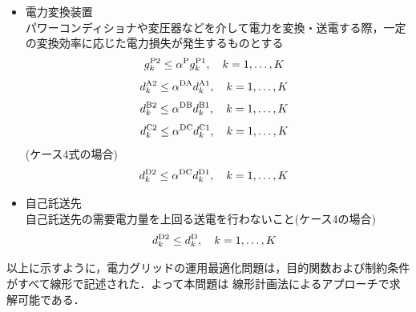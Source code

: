\begin{itemize}
	\item 電力変換装置\\
		パワーコンディショナや変圧器などを介して電力を変換・送電する際，一定の変換効率に応じた電力損失が発生するものとする
		\begin{equation}
 			  g^{\rm P2}_{k} \le \alpha^{\rm P} g^{\rm P1}_{k} ,
 			\quad
 			k=1,\ldots,K
			~~
			\label{eq:gP1gP2}
		\end{equation}
		\begin{equation}
 			   d^{\rm A2}_{k} \le \alpha^{\rm DA} d^{\rm A1}_{k} ,
 			\quad
 			k=1,\ldots,K
			~~
			\label{eq:dA1A2}
		\end{equation}
		\begin{equation}
 			 d^{\rm B2}_{k} \le \alpha^{\rm DB} d^{\rm B1}_{k} ,
 			\quad
 			k=1,\ldots,K
			~~
			\label{eq:dB1B2}
		\end{equation}
		\begin{equation}
 			  d^{\rm C2}_{k} \le \alpha^{\rm DC} d^{\rm C1}_{k},
 			\quad
 			k=1,\ldots,K
			~~
			\label{eq:dC1C2}
		\end{equation}
		(ケース4式の場合)
		\begin{equation}
 			  d^{\rm D2}_{k} \le \alpha^{\rm DC} d^{\rm D1}_{k},
 			\quad
 			k=1,\ldots,K
			~~
			\label{eq:dD1D2}
		\end{equation}
	\item 自己託送先\\
		自己託送先の需要電力量を上回る送電を行わないこと(ケース4の場合)
		\begin{equation}
 			  d^{\rm D2}_{k} \le d^{\rm D}_{k},
 			\quad
 			k=1,\ldots,K
			~~
			\label{eq:dD1D2}
		\end{equation}
\end{itemize}

以上に示すように，電力グリッドの運用最適化問題は，目的関数および制約条件がすべて線形で記述された．よって本問題は
線形計画法によるアプローチで求解可能である．

